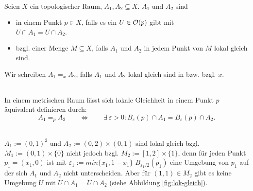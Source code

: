 
    \begin{dfn}\label{def:lok-gleich}\ \\
        Seien $X$ ein topologischer Raum, $A_1, A_2 \subseteq X$.
        $A_1$ und $A_2$ sind  
        \begin{itemize}
            \item in einem Punkt ${p \in X}$, falls es ein ${U \in \mathcal{O}(p)}$ gibt mit \\
            ${U \cap A_1 = U \cap A_2}$.
            \item bzgl. einer Menge $M \subseteq X$, falls $A_1$ und $A_2$ in jedem Punkt von $M$ lokal gleich sind.
        \end{itemize}
        Wir schreiben ${A_1 =_x A_2}$, falls $A_1$ und $A_2$ lokal gleich sind in bzw. bzgl. $x$.
    \end{dfn}
    
    \begin{bem}\ \\
     In einem metrischen Raum lässt sich lokale Gleichheit in einem Punkt $p$ äquivalent definieren durch:
     $$ A_1 =_p A_2 \quad \quad \Leftrightarrow \quad \quad \exists\: \varepsilon > 0 : B_\varepsilon(p) \cap A_1 = B_\varepsilon(p) \cap A_2.$$
    \end{bem}
    
    \begin{bsp}\label{bsp:lok-gleich}\ \\
     $A_1 := (0,1)^2$ und $A_2 := (0,2) \times (0,1)$ sind lokal gleich bzgl. $M_1 := (0,1) \times \{0\}$ nicht jedoch bzgl. $M_2 := [1,2] \times \{1\}$, denn für jeden Punkt $p_1 = (x_1,0)$ ist mit $\varepsilon_1 := min\{x_1,1-x_1\}$ $B_{\varepsilon_1/2}(p_1)$ eine Umgebung von $p_1$ auf der sich $A_1$ und $A_2$ nicht unterscheiden.
     Aber für $(1,1) \in M_2$ gibt es keine Umgebung $U$ mit $U \cap A_1 = U \cap A_2$ (siehe Abbildung \ref{fig:lok-gleich}).
    \end{bsp}
    
